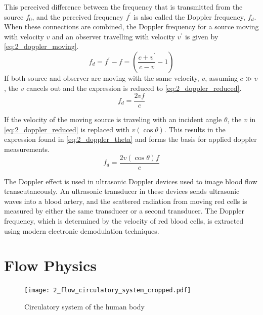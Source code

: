 This perceived difference between the frequency that is transmitted from the source $f_{0}$, and the perceived frequency $f^{\prime}$ is also called the Doppler frequency, $f_{d}$. When these connections are combined, the Doppler frequency for a source moving with velocity $v$ and an observer travelling with velocity $v^{\prime}$ is given by \cref{eq:2_doppler_moving}.
\begin{equation} \label{eq:2_doppler_moving}
	f_{d} = f^{\prime} - f = \left( \frac{c + v^{\prime}}{c - v}-1 \right)
\end{equation}
If both source and observer are moving with the same velocity, $v$, assuming $c\gg v$, the $v$ cancels out and the expression is reduced to \cref{eq:2_doppler_reduced}.
\begin{equation} \label{eq:2_doppler_reduced}
	f_{d} = \frac{2 v f}{c}
\end{equation}

If the velocity of the moving source is traveling with an incident angle $\theta$, the $v$ in \cref{eq:2_doppler_reduced} is replaced with $v (\cos\theta)$. This results in the expression found in \cref{eq:2_doppler_theta} and forms the basis for applied \gls{doppler} measurements.
\begin{equation} \label{eq:2_doppler_theta}
	f_{d} = \frac{2 v(\cos\theta) f}{c}
\end{equation}

The Doppler effect is used in ultrasonic Doppler devices used to image blood flow \gls{transcutaneous}ly. An ultrasonic transducer in these devices sends ultrasonic waves into a blood artery, and the scattered radiation from moving red cells is measured by either the same transducer or a second transducer. The Doppler frequency, which is determined by the velocity of red blood cells, is extracted using modern electronic demodulation techniques.

\section{Flow Physics}
\begin{figure}[ht!]
	\centering
	\texttt{[image: 2\_flow\_circulatory\_system\_cropped.pdf]}
	\caption[Circulatory system of the human body]{Circulatory system of the human body \cite{JensenUltrasoundBook}}
	\label{fig:2_circulatory_system}
\end{figure}

